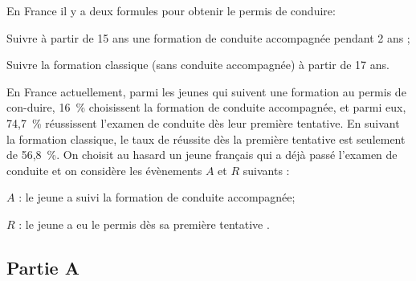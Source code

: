 
	\begin{list}{\textbullet}{En France il y a deux formules pour obtenir le permis de conduire:}
			\item Suivre à partir de 15 ans une formation de conduite accompagnée pendant 2 ans ;
		\item Suivre la formation classique (sans conduite accompagnée) à partir de 17 ans.
	\end{list}


	En France actuellement, parmi les jeunes qui suivent une formation au permis de con-duire, 16~\% choisissent la formation de conduite accompagnée, et parmi eux, 74,7~\% réussissent l'examen de conduite dès leur première tentative.
	En suivant la formation classique, le taux de réussite dès la première tentative est seulement de 56,8~\%.
	On choisit au hasard un jeune français qui a déjà passé l'examen de conduite et on considère les évènements $A$ et $R$ suivants :

	\begin{list}{\textbullet}{}
		\item $A$ : \og le jeune a suivi la formation de conduite accompagnée\fg{};
		\item $R$ : \og le jeune a eu le permis dès sa première tentative \fg{}.
	\end{list}

%
%

	\subsection*{Partie A}

